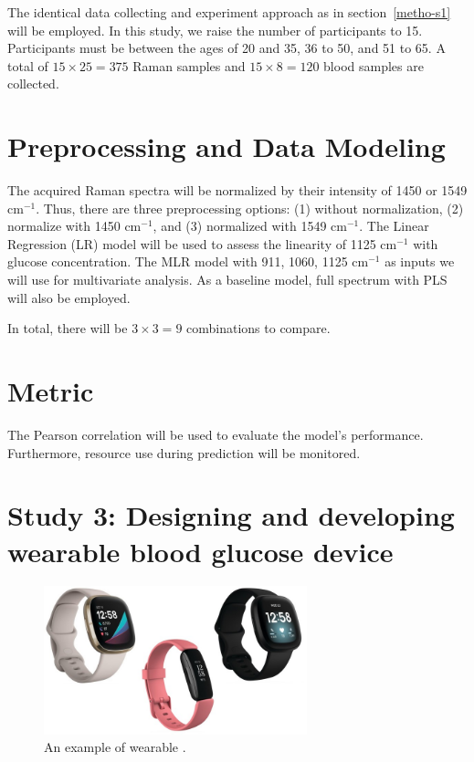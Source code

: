 The identical data collecting and experiment approach as in section~\ref{metho-s1} will be employed.
In this study, we raise the number of participants to 15.
Participants must be between the ages of 20 and 35, 36 to 50, and 51 to 65.
A total of $15 \times 25 =  375$ Raman samples and $15 \times 8 = 120$ blood samples are collected.

\section{Preprocessing and Data Modeling}

The acquired Raman spectra will be normalized by their intensity of 1450 or 1549 $\text{cm}^{-1}$.
Thus, there are three preprocessing options: (1) without normalization, (2) normalize with 1450 $\text{cm}^{-1}$, and (3) normalized with 1549 $\text{cm}^{-1}$.
The Linear Regression (LR) model will be used to assess the linearity of 1125 $\text{cm}^{-1}$ with glucose concentration.
The MLR model with 911, 1060, 1125 $\text{cm}^{-1}$ as inputs we will use for multivariate analysis.
As a baseline model, full spectrum with PLS will also be employed.

In total, there will be $3 \times 3 = 9$ combinations to compare.

\section{Metric}

The Pearson correlation will be used to evaluate the model's performance.
Furthermore, resource use during prediction will be monitored.

\section{Study 3: Designing and developing wearable blood glucose device}

\begin{figure}
    \caption{An example of wearable \citep{fitbitwatch}.}
    \centerline{\includegraphics[width=3in]{figures/example-fitbit.jpeg}}\label{fig:fitbitwatch}
\end{figure}


